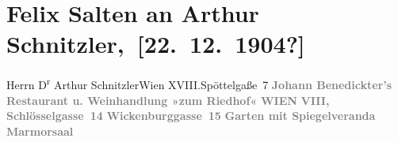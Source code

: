 

         
         \renewcommand{\erwaehntePersonen}{Personen: Johann Benedickter, Anna Katharina Rehmann, Felix Salten, Ottilie Salten}
         \renewcommand{\erwaehnteOrte}{Orte: Edmund-Weiß-Gasse 7, Riedhof, Schlösselgasse, Wickenburggasse, Wien, XVIII., Währing}
         \renewcommand{\erwaehnteWerke}{Werke: Symphonie Nr. 3 D-Moll}
               \section[ Felix Salten an Arthur Schnitzler, {[}22. 12. 1904?{]}]{ Felix Salten an Arthur Schnitzler, {[}22. 12. 1904?{]}}\nopagebreak{}\rehead{ }\begin{ledgroupsized}[t]{13cm}\normalsize\beginnumbering{} \toendnotes[C]{\smallbreak\pagebreak[2]} 
\toendnotes[C]{\smallbreak}\pstart{}{\pb}Herrn D\textsuperscript{r} Arthur Schnitzler\pend{}\pstart{}Wien XVIII.\pend{}\pstart{}Spöttelgaße 7\pend{}{\bigskip}\pstart
           \noindent{}\centering{}{\pb}\textcolor{gray}{\textbf{Johann Benedickter’s}}\pend
           \pstart
           \noindent{}\centering{}\textcolor{gray}{\textbf{Restaurant u. Weinhandlung »zum Riedhof«}}\pend
           \pstart
           \noindent{}\centering{}\textcolor{gray}{\textbf{WIEN}}\pend
           \pstart
           \noindent{}\centering{}\textcolor{gray}{\textbf{VIII, Schlösselgasse 14}}\pend
           \pstart
           \noindent{}\centering{}\textcolor{gray}{\textbf{Wickenburggasse 15}}\pend
           \pstart
           \noindent{}\centering{}\textcolor{gray}{\textbf{Garten mit Spiegelveranda}}\pend
           \pstart
           \noindent{}\centering{}\textcolor{gray}{\textbf{Marmorsaal}}\pend
           \pstart

\end{ledgroupsized}
